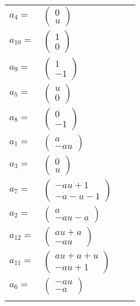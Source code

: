 \documentclass[1p]{elsarticle_modified}
\theoremstyle{definition}
\begin{document}
\begin{tabular}{m{7pt} m{180pt} m{7pt} m{180pt} }
\flushright $a_{4}=$&$\begin{pmatrix}0\\u\end{pmatrix}$ \\
\flushright $a_{10}=$&$\begin{pmatrix}1\\0\end{pmatrix}$ \\
\flushright $a_{9}=$&$\begin{pmatrix}1\\-1\end{pmatrix}$ \\
\flushright $a_{5}=$&$\begin{pmatrix}u\\0\end{pmatrix}$ \\
\flushright $a_{8}=$&$\begin{pmatrix}0\\-1\end{pmatrix}$ \\
\flushright $a_{1}=$&$\begin{pmatrix}a\\- a u\end{pmatrix}$ \\
\flushright $a_{3}=$&$\begin{pmatrix}0\\u\end{pmatrix}$ \\
\flushright $a_{7}=$&$\begin{pmatrix}- a u+1\\- a- u-1\end{pmatrix}$ \\
\flushright $a_{2}=$&$\begin{pmatrix}a\\- a u- a\end{pmatrix}$ \\
\flushright $a_{12}=$&$\begin{pmatrix}a u+a\\- a u\end{pmatrix}$ \\
\flushright $a_{11}=$&$\begin{pmatrix}a u+a+u\\- a u+1\end{pmatrix}$ \\
\flushright $a_{6}=$&$\begin{pmatrix}- a u\\- a\end{pmatrix}$\\&\end{tabular}
\end{document}
